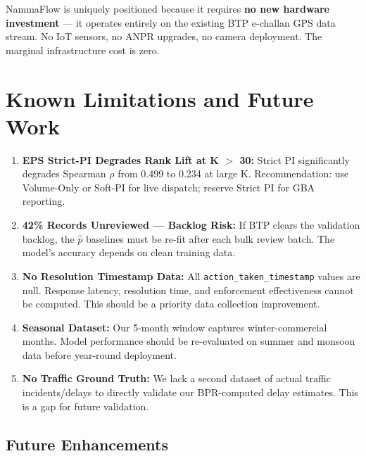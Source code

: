 \documentclass[12pt,a4paper]{article}
\begin{document}
NammaFlow is uniquely positioned because it requires \textbf{no new hardware investment} — it operates entirely on the existing BTP e-challan GPS data stream. No IoT sensors, no ANPR upgrades, no camera deployment. The marginal infrastructure cost is zero.

\section{Known Limitations and Future Work}

\begin{tcolorbox}[warnbox, title={Operational Caveats (Honest Disclosure)}]
\begin{enumerate}[leftmargin=1.5em, itemsep=4pt]
    \item \textbf{EPS Strict-PI Degrades Rank Lift at K $>$ 30:} Strict PI significantly degrades Spearman $\rho$ from 0.499 to 0.234 at large K. Recommendation: use Volume-Only or Soft-PI for live dispatch; reserve Strict PI for GBA reporting.
    
    \item \textbf{42\% Records Unreviewed — Backlog Risk:} If BTP clears the validation backlog, the $\hat{p}$ baselines must be re-fit after each bulk review batch. The model's accuracy depends on clean training data.
    
    \item \textbf{No Resolution Timestamp Data:} All \texttt{action\_taken\_timestamp} values are null. Response latency, resolution time, and enforcement effectiveness cannot be computed. This should be a priority data collection improvement.
    
    \item \textbf{Seasonal Dataset:} Our 5-month window captures winter-commercial months. Model performance should be re-evaluated on summer and monsoon data before year-round deployment.
    
    \item \textbf{No Traffic Ground Truth:} We lack a second dataset of actual traffic incidents/delays to directly validate our BPR-computed delay estimates. This is a gap for future validation.
\end{enumerate}
\end{tcolorbox}

\subsection{Future Enhancements}
\end{document}
